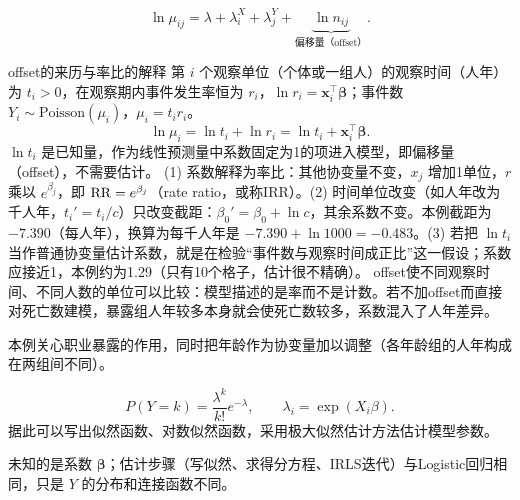 \[
\ln\mu_{ij}=\lambda+\lambda_i^X+\lambda_j^Y+\underbrace{\ln n_{ij}}_{\text{偏移量（offset）}}.
\]
\begin{derivation}{offset的来历与率比的解释}
第 $i$ 个观察单位（个体或一组人）的观察时间（人年）为 $t_i>0$，在观察期内事件发生率恒为 $r_i$，$\ln r_i=\bm x_i^\top\bm\beta$；事件数 $Y_i\sim\text{Poisson}(\mu_i)$，$\mu_i=t_ir_i$。
\[
\ln\mu_i=\ln t_i+\ln r_i=\ln t_i+\bm x_i^\top\bm\beta .
\]
$\ln t_i$ 是已知量，作为线性预测量中系数固定为1的项进入模型，即偏移量（offset），不需要估计。
(1) 系数解释为率比：其他协变量不变，$x_j$ 增加1单位，$r$ 乘以 $e^{\beta_j}$，即 $\operatorname{RR}=e^{\beta_j}$（rate ratio，或称IRR）。(2) 时间单位改变（如人年改为千人年，$t_i'=t_i/c$）只改变截距：$\beta_0'=\beta_0+\ln c$，其余系数不变。本例截距为 $-7.390$（每人年），换算为每千人年是 $-7.390+\ln1000=-0.483$。(3) 若把 $\ln t_i$ 当作普通协变量估计系数，就是在检验“事件数与观察时间成正比”这一假设；系数应接近1，本例约为1.29（只有10个格子，估计很不精确）。
offset使不同观察时间、不同人数的单位可以比较：模型描述的是率而不是计数。若不加offset而直接对死亡数建模，暴露组人年较多本身就会使死亡数较多，系数混入了人年差异。
\end{derivation}
\begin{annotation}本例关心职业暴露的作用，同时把年龄作为协变量加以调整（各年龄组的人年构成在两组间不同）。\end{annotation}
\[
P(Y=k)=\frac{\lambda^k}{k!}e^{-\lambda},\qquad \lambda_i=\exp(X_i\beta).
\]
据此可以写出似然函数、对数似然函数，采用极大似然估计方法估计模型参数。
\begin{annotation}未知的是系数 $\bm\beta$；估计步骤（写似然、求得分方程、IRLS迭代）与Logistic回归相同，只是 $Y$ 的分布和连接函数不同。\end{annotation}

